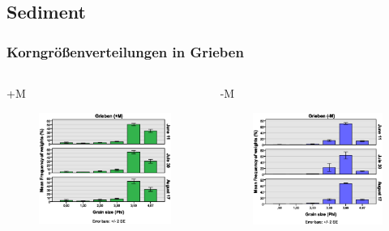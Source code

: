 \documentclass{beamer}
\begin{document}
\subsection{Sediment}

\begin{frame}
\frametitle{Korngrößenverteilungen in Grieben}
\begin{columns}
\begin{column}{5.5cm}
+M
\begin{figure}
\includegraphics[width=\textwidth]{images/grainsize/sediment_im_jahr3.eps}
\end{figure}
\end{column}
\begin{column}{5.5cm}
-M
\begin{figure}
\includegraphics[width=\textwidth]{images/grainsize/sediment_im_jahr4.eps}
\end{figure}
\end{column}
\end{columns}
\end{frame}
\end{document}
